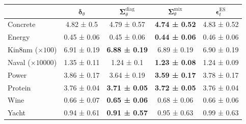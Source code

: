 \begin{tabular}{l|c|c|c|c}
\toprule
 & $\bm\delta_\theta$ & $\bm\Sigma_\theta^{\mathrm{diag}}$ & $\bm\Sigma_\theta^{\mathrm{mix}}$ & $\bm\epsilon_t^\mathrm{ES}$ \\
\midrule
Concrete & 4.82 ± 0.5 & 4.79 ± 0.57 & \textbf{4.74 ± 0.52} & 4.83 ± 0.52 \\
Energy & 0.45 ± 0.06 & 0.45 ± 0.06 & \textbf{0.44 ± 0.06} & 0.46 ± 0.06 \\
Kin8nm ($\times 100$) & 6.91 ± 0.19 & \textbf{6.88 ± 0.19} & 6.89 ± 0.19 & 6.90 ± 0.19 \\
Naval ($\times 10000$) & 1.35 ± 0.11 & 1.24 ± 0.1 & \textbf{1.23 ± 0.08} & 1.24 ± 0.09 \\
Power & 3.86 ± 0.17 & 3.64 ± 0.19 & \textbf{3.59 ± 0.17} & 3.78 ± 0.17 \\
Protein & 3.76 ± 0.04 & \textbf{3.71 ± 0.05} & \textbf{3.72 ± 0.05} & 3.76 ± 0.04 \\
Wine & 0.66 ± 0.07 & \textbf{0.65 ± 0.06} & 0.68 ± 0.06 & 0.66 ± 0.06 \\
Yacht & 0.94 ± 0.61 & \textbf{0.91 ± 0.57} & 0.95 ± 0.63 & 0.99 ± 0.63 \\
\bottomrule
\end{tabular}
